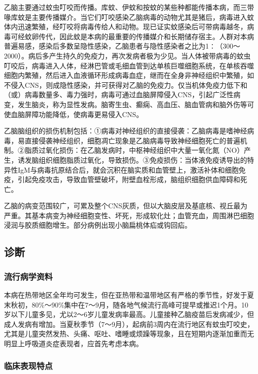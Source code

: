 乙脑主要通过蚊虫叮咬而传播。库蚊、伊蚊和按蚊的某些种都能传播本病，而三带喙库蚊是主要传播媒介。当它们叮咬感染乙脑病毒的动物尤其是猪后，病毒进入蚊体内迅速繁殖，经叮咬将病毒传给人和动物。现已证实蚊感染后可带病毒越冬，病毒可经蚊卵传代，因此蚊是本病的最重要的传播媒介和长期储存宿主。人群对本病普遍易感，感染后多数呈隐性感染，乙脑患者与隐性感染者之比为1∶（300～2000）。病后多产生持久的免疫力，再次发病者极为少见。当人体被带病毒的蚊虫叮咬后，病毒进入人体，经淋巴管或毛细血管到达单核巨噬细胞系统，在单核吞噬细胞内繁殖，然后进入血液循环形成病毒血症，继而在全身非神经组织中繁殖，如不侵入CNS，则成隐性感染，并可获得对乙脑的免疫力。仅当机体免疫力低下和（或）病毒数量多、毒力强时，病毒可通过血脑屏障侵入CNS，引起广泛性病变，发生脑炎，称为显性发病。脑寄生虫、癫痫、高血压、脑血管病和脑外伤等可使血脑屏障功能降低，使病毒更易侵入CNS。

乙脑脑组织的损伤机制包括：①病毒对神经组织的直接侵袭：乙脑病毒是嗜神经病毒，易直接侵袭神经组织，细胞凋亡现象是乙脑病毒导致神经细胞死亡的普遍机制。②脂质过氧化损伤：在乙脑发病时，中枢神经组织中大量一氧化氮（NO）产生，诱发脑组织细胞脂质过氧化，导致损伤。③免疫损伤：当体液免疫诱导出的特异性IgM与病毒抗原结合后，就会沉积在脑实质和血管壁上，激活补体和细胞免疫，引起免疫攻击，导致血管壁破坏，附壁血栓形成，脑组织细胞供血障碍和死亡。

乙脑的病变范围较广，可累及整个CNS灰质，但以大脑皮层及基底核、视丘最为严重。其基本病变为神经细胞变性、坏死，形成软化灶；血管充血，周围淋巴细胞浸润与胶质细胞增生。部分病例出现小脑扁桃体疝或钩回疝。

\subsection{诊断}

\subsubsection{流行病学资料}

本病在热带地区全年均可发生，但在亚热带和温带地区有严格的季节性，好发于夏末秋初，80\%～90\%集中在7～9月，随各地气候流行高峰可提早或推迟1个月。10岁以下儿童多见，尤以2～6岁儿童发病率最高。儿童接种乙脑疫苗后发病减少，但成人发病有增加。当夏秋季节（7～9月），起病前3周内在流行地区有蚊虫叮咬史，尤其是儿童突然发热、头痛、呕吐、嗜睡或烦躁等现象，且在短期内逐渐加重而无明显上呼吸道炎症表现者，应首先考虑本病。

\subsubsection{临床表现特点}


